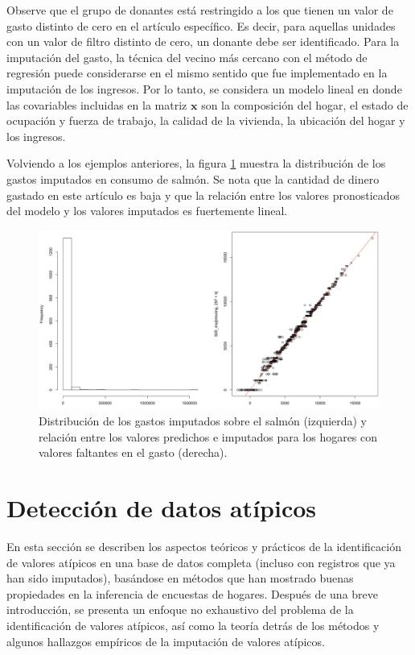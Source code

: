 \documentclass[
  12pt,
]{book}
\begin{document}
Observe que el grupo de donantes está restringido a los que tienen un valor de gasto distinto de cero en el artículo específico. Es decir, para aquellas unidades con un valor de filtro distinto de cero, un donante debe ser identificado. Para la imputación del gasto, la técnica del vecino más cercano con el método de regresión puede considerarse en el mismo sentido que fue implementado en la imputación de los ingresos. Por lo tanto, se considera un modelo lineal en donde las covariables incluidas en la matriz \(\mathbf{x}\) son la composición del hogar, el estado de ocupación y fuerza de trabajo, la calidad de la vivienda, la ubicación del hogar y los ingresos.

Volviendo a los ejemplos anteriores, la figura \ref{fig:fig13} muestra la distribución de los gastos imputados en consumo de salmón. Se nota que la cantidad de dinero gastado en este artículo es baja y que la relación entre los valores pronosticados del modelo y los valores imputados es fuertemente lineal.

\begin{figure}
\includegraphics[width=0.5\linewidth]{Pics/13} \caption{Distribución de los gastos imputados sobre el salmón (izquierda) y relación entre los valores predichos e imputados para los hogares con valores faltantes en el gasto (derecha).}\label{fig:fig13}
\end{figure}

\hypertarget{detecciuxf3n-de-datos-atuxedpicos}{%
\chapter{Detección de datos atípicos}\label{detecciuxf3n-de-datos-atuxedpicos}}

En esta sección se describen los aspectos teóricos y prácticos de la identificación de valores atípicos en una base de datos completa (incluso con registros que ya han sido imputados), basándose en métodos que han mostrado buenas propiedades en la inferencia de encuestas de hogares. Después de una breve introducción, se presenta un enfoque no exhaustivo del problema de la identificación de valores atípicos, así como la teoría detrás de los métodos y algunos hallazgos empíricos de la imputación de valores atípicos.
\end{document}
